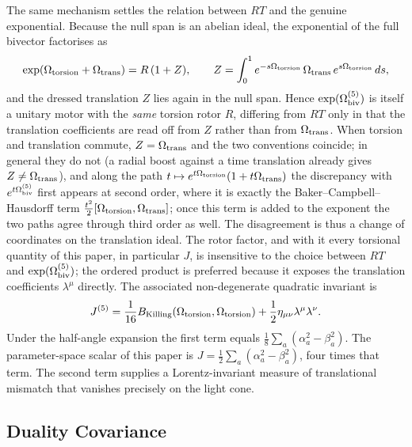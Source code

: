 \documentclass[a4paper]{article}
\theoremstyle{definition}
\theoremstyle{remark}
\begin{document}
The same mechanism settles the relation between \( RT \) and the genuine exponential. Because the null span is an abelian ideal, the exponential of the full bivector factorises as
\[
\exp(\Omega_{\rm torsion}+\Omega_{\rm trans}) = R\,(1+Z), \qquad Z = \int_0^1 e^{-s\Omega_{\rm torsion}}\,\Omega_{\rm trans}\,e^{s\Omega_{\rm torsion}}\,ds,
\]
and the dressed translation \( Z \) lies again in the null span. Hence \( \exp(\Omega_{\rm biv}^{(5)}) \) is itself a unitary motor with the \emph{same} torsion rotor \( R \), differing from \( RT \) only in that the translation coefficients are read off from \( Z \) rather than from \( \Omega_{\rm trans} \). When torsion and translation commute, \( Z=\Omega_{\rm trans} \) and the two conventions coincide; in general they do not (a radial boost against a time translation already gives \( Z\neq\Omega_{\rm trans} \)), and along the path \( t\mapsto e^{t\Omega_{\rm torsion}}(1+t\Omega_{\rm trans}) \) the discrepancy with \( e^{t\Omega_{\rm biv}^{(5)}} \) first appears at second order, where it is exactly the Baker--Campbell--Hausdorff term \( \tfrac{t^2}{2}[\Omega_{\rm torsion},\Omega_{\rm trans}] \); once this term is added to the exponent the two paths agree through third order as well. The disagreement is thus a change of coordinates on the translation ideal. The rotor factor, and with it every torsional quantity of this paper, in particular \( J \), is insensitive to the choice between \( RT \) and \( \exp(\Omega_{\rm biv}^{(5)}) \); the ordered product is preferred because it exposes the translation coefficients \( \lambda^\mu \) directly. The associated non-degenerate quadratic invariant is
\[
J^{(5)} = \frac{1}{16} B_{\rm Killing}(\Omega_{\rm torsion}, \Omega_{\rm torsion}) + \frac{1}{2} \eta_{\mu\nu} \lambda^\mu \lambda^\nu.
\]
Under the half-angle expansion the first term equals \(\frac18\sum_a(\alpha_a^2-\beta_a^2)\). The parameter-space scalar of this paper is \( J=\frac12\sum_a(\alpha_a^2-\beta_a^2) \), four times that term. The second term supplies a Lorentz-invariant measure of translational mismatch that vanishes precisely on the light cone.

\subsection{Duality Covariance}
\end{document}
